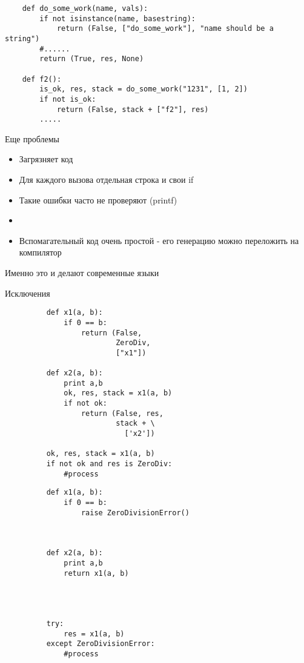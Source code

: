 \documentclass{article}
\begin{document}
\begin{lstlisting}
	def do_some_work(name, vals):
		if not isinstance(name, basestring):
			return (False, ["do_some_work"], "name should be a string")
		#......
		return (True, res, None)

	def f2():
		is_ok, res, stack = do_some_work("1231", [1, 2])
		if not is_ok:
			return (False, stack + ["f2"], res)
		.....
\end{lstlisting}
\newpage

\begin{center} Еще проблемы \end{center}
\begin{itemize}
	\item Загрязняет код
	\item Для каждого вызова отдельная строка и свои if
	\item Такие ошибки часто не проверяют (printf)
	\item
	\item Вспомагательный код очень простой - его 
		  генерацию можно переложить на компилятор
\end{itemize}
\newpage

\begin{center} Именно это и делают современные языки \end{center}
\begin{center} Исключения \end{center}
\begin{figure}[ht]
\begin{minipage}[b]{0.45\linewidth}
\Large
\begin{lstlisting}
	def x1(a, b):
		if 0 == b:
			return (False, 
					ZeroDiv, 
				    ["x1"])

	def x2(a, b):
		print a,b
		ok, res, stack = x1(a, b)
		if not ok:
			return (False, res, 
					stack + \
					  ['x2'])

	ok, res, stack = x1(a, b)
	if not ok and res is ZeroDiv:
		#process
\end{lstlisting}
\end{minipage}
\hspace{2cm}
\begin{minipage}[b]{0.45\linewidth}
\Large
\begin{lstlisting}
	def x1(a, b):
		if 0 == b:
			raise ZeroDivisionError()



	def x2(a, b):
		print a,b
		return x1(a, b)




	try:
		res = x1(a, b)
	except ZeroDivisionError:
		#process
\end{lstlisting}
\end{minipage}
\end{figure}
\newpage
\end{document}
